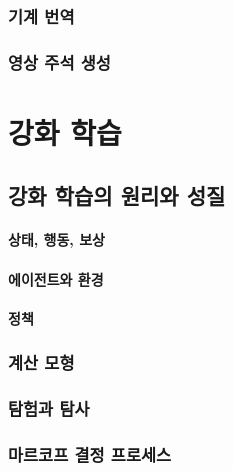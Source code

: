 \documentclass [12pt] {oblivoir}
\let\oldsubsubsection=\subsubsection
\renewcommand{\subsubsection}
{
  \filbreak
  \oldsubsubsection
}
\begin{document}
\vspace{3mm}

\subsubsection{기계 번역}

\subsubsection{영상 주석 생성}

\newpage
\section{강화 학습}

\subsection{강화 학습의 원리와 성질}

\paragraph*{상태, 행동, 보상}\mbox{}

\vspace{3mm}

\paragraph*{에이전트와 환경}\mbox{}

\vspace{3mm}

\paragraph*{정책}\mbox{}

\vspace{3mm}

\subsubsection{계산 모형}

\subsubsection{탐험과 탐사}

\subsubsection{마르코프 결정 프로세스}
\end{document}
